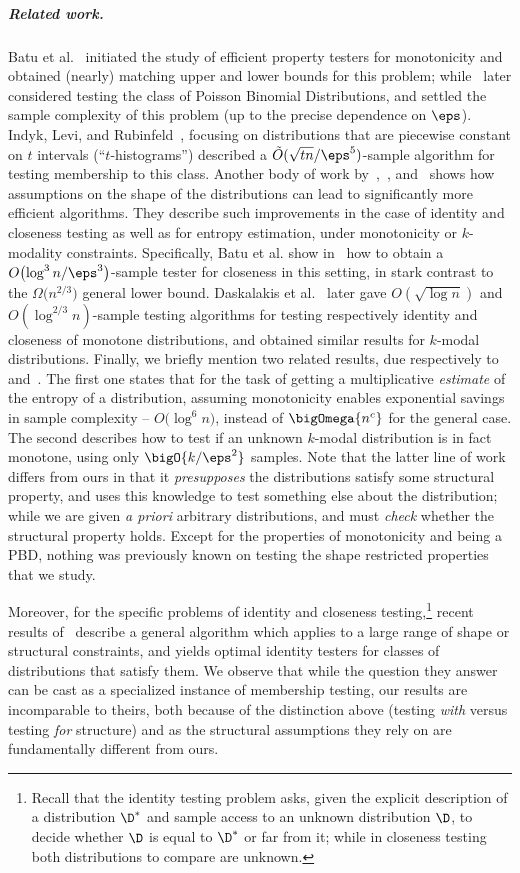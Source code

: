 \subparagraph{Related work.} Batu et al.~\cite{BKR:04} initiated the study of efficient property testers for monotonicity and obtained (nearly) matching upper and lower bounds for this problem; while~\cite{AD:15} later considered testing the class of Poisson Binomial Distributions, and settled the sample complexity of this problem (up to the precise dependence on $\eps$). Indyk, Levi, and Rubinfeld~\cite{ILR:12}, focusing on distributions that are piecewise constant on $t$ intervals (``$t$-histograms'') described a $\tilde{O}(\sqrt{tn}/\eps^5)$-sample algorithm for testing membership to this class. Another body of work by~\cite{BDKR:05},~\cite{BKR:04}, and~\cite{DDSV:13} shows how assumptions on the shape of the distributions can lead to significantly more efficient algorithms. They describe such improvements in the case of identity and closeness testing as well as for entropy estimation, under monotonicity or $k$-modality constraints. Specifically, Batu et al. show in~\cite{BKR:04} how to obtain a $O\big({\log^3 n/\eps^3}\big)$-sample tester for closeness in this setting, in stark contrast to the $\Omega\big({{n}^{2/3}}\big)$ general lower bound. Daskalakis et al.~\cite{DDSV:13} later gave ${O}(\sqrt{\log n})$ and ${O}({\log^{2/3} n})$-sample testing algorithms for testing respectively identity and closeness of monotone distributions, and obtained similar results for $k$-modal distributions. Finally, we briefly mention two related results, due respectively to~\cite{BDKR:05} and~\cite{DDS:12}. The first one states that for the task of getting a multiplicative \emph{estimate} of the entropy of a distribution, assuming monotonicity enables exponential savings in sample complexity -- $O\big({\log^6 n}\big)$, instead of $\bigOmega{n^c}$ for the general case. The second describes how to test if an unknown $k$-modal distribution is in fact monotone, using only $\bigO{k/\eps^2}$ samples. Note that the latter line of work differs from ours in that it \emph{presupposes} the distributions satisfy some structural property, and uses this knowledge to test something else about the distribution; while we are given \textit{a priori} arbitrary distributions, and must \emph{check} whether the structural property holds. Except for the properties of monotonicity and being a PBD, nothing was previously known on testing the shape restricted properties that we study.

Moreover, for the specific problems of identity and closeness testing,\footnote{Recall that the identity testing problem asks, given the explicit description of a distribution $\D^\ast$ and sample access to an unknown distribution $\D$, to decide whether $\D$ is equal to $\D^\ast$ or far from it; while in closeness testing both distributions to compare are unknown.} recent results of~\cite{DKN:15,DKN:15:FOCS} describe a general algorithm which applies to a large range of shape or structural constraints, and yields optimal identity testers for classes of distributions that satisfy them. We observe that while the question they answer can be cast as a specialized instance of membership testing, our results are incomparable to theirs, both because of the distinction above (testing \emph{with} versus testing \emph{for} structure) and as the structural assumptions they rely on are fundamentally different from ours.

